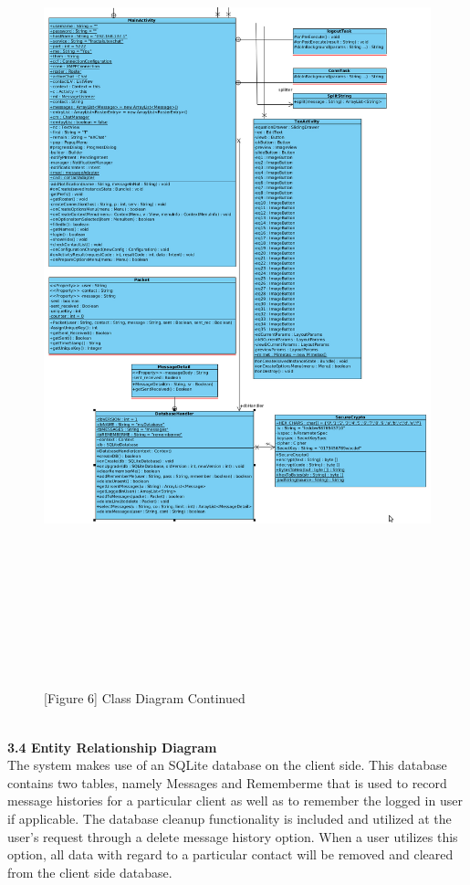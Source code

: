 \documentclass[29pt,a4paper]{moderncv}
\begin{document}
\begin{figure}
				\centering
				\\ \includegraphics[width=6.7in, height=8.6in]{./classDiagram_part2.jpg}
				\\\caption{[Figure 6] Class Diagram Continued}\\
			\end{figure}
\newpage	
	\\ \noindent \textbf{3.4 Entity Relationship Diagram}
	\\The system makes use of an SQLite database on the client side. This database contains two tables, namely Messages and Rememberme that is used to record message histories for a particular client as well as to remember the logged in user if applicable. 
	\parindent 5mm The database cleanup functionality is included and utilized at the user’s request through a delete message history option. When a user utilizes this option, all data with regard to a particular contact will be removed and cleared from the client side database.
	\\ \\
	
\end{document}

